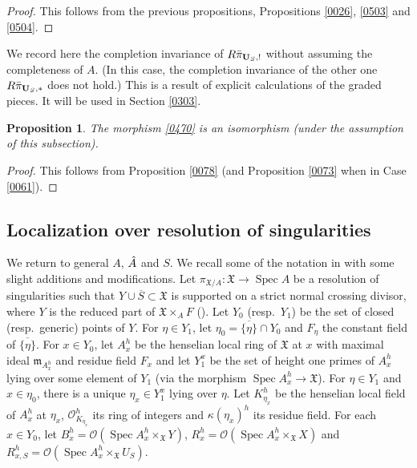 \documentclass{amsart}
\newtheorem{Prop}[Thm]{Proposition}
\theoremstyle{remark}
\numberwithin{equation}{subsection}
\newcommand{\Order}{\mathcal{O}}
\newcommand{\closure}[1]{\overline{#1}}
\newcommand{\alg}[1]{\mathbf{#1}}
\newcommand{\ideal}[1]{\mathfrak{#1}}
\DeclareMathOperator{\Spec}{Spec}
\begin{document}
\begin{proof}
	This follows from the previous propositions,
	Propositions \ref{0026}, \ref{0503} and \ref{0504}.
\end{proof}

We record here the completion invariance of $R \Bar{\pi}_{\alg{U}_{S}, !}$
without assuming the completeness of $A$.
(In this case, the completion invariance of the other one
$R \Bar{\pi}_{\alg{U}_{S}, \ast}$ does not hold.)
This is a result of explicit calculations of the graded pieces.
It will be used in Section \ref{0303}.

\begin{Prop} \label{0295}
	The morphism \eqref{0470} is an isomorphism (under the assumption of this subsection).
\end{Prop}

\begin{proof}
	This follows from
	Proposition \ref{0078}
	(and Proposition \ref{0073}
	when in Case \eqref{0061}).
\end{proof}


\subsection{Localization over resolution of singularities}
\label{0297}

We return to general $A$, $\Hat{A}$ and $S$.
We recall some of the notation in \cite[\S 1]{Sai86}
with some slight additions and modifications.
Let $\pi_{\mathfrak{X} / A} \colon \mathfrak{X} \to \Spec A$ be a resolution of singularities
such that $Y \cup \closure{S} \subset \mathfrak{X}$ is
supported on a strict normal crossing divisor,
where $Y$ is the reduced part of $\mathfrak{X} \times_{A} F$ (\cite[Tag 0BIC]{Sta21}).
Let $Y_{0}$ (resp.\ $Y_{1}$) be the set of closed (resp.\ generic) points of $Y$.
For $\eta \in Y_{1}$, let $\eta_{0} = \closure{\{\eta\}} \cap Y_{0}$
and $F_{\eta}$ the constant field of $\closure{\{\eta\}}$.
For $x \in Y_{0}$, let $A_{x}^{h}$ be the henselian local ring of $\mathfrak{X}$ at $x$
with maximal ideal $\ideal{m}_{A_{x}^{h}}$ and residue field $F_{x}$
and let $Y_{1}^{x}$ be the set of height one primes of $A_{x}^{h}$
lying over some element of $Y_{1}$ (via the morphism $\Spec A_{x}^{h} \to \mathfrak{X}$).
For $\eta \in Y_{1}$ and $x \in \eta_{0}$,
there is a unique $\eta_{x} \in Y_{1}^{x}$ lying over $\eta$.
Let $K_{\eta_{x}}^{h}$ be the henselian local field of $A_{x}^{h}$ at $\eta_{x}$,
$\Order_{K_{\eta_{x}}}^{h}$ its ring of integers
and $\kappa(\eta_{x})^{h}$ its residue field.
For each $x \in Y_{0}$,
let $B_{x}^{h} = \Order(\Spec A_{x}^{h} \times_{\mathfrak{X}} Y)$,
$R_{x}^{h} = \Order(\Spec A_{x}^{h} \times_{\mathfrak{X}} X)$
and $R_{x, S}^{h} = \Order(\Spec A_{x}^{h} \times_{\mathfrak{X}} U_{S})$.
\end{document}
